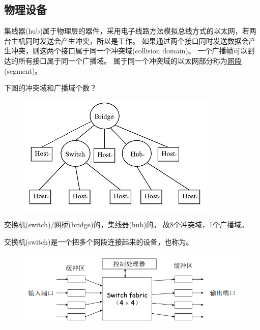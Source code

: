 \subsection{物理设备}
集线器(hub)属于物理层的器件，采用电子线路方法模拟总线方式的以太网，若两台主机同时发送会产生冲突，所以是工作。
如果通过两个接口同时发送数据会产生冲突，则这两个接口属于同一个冲突域(collision domain)。
一个广播帧可以到达的所有接口属于同一个广播域。
属于同一个冲突域的以太网部分称为\underline{网段}(segment)。
\begin{example}
	下图的冲突域和广播域个数？
	\begin{figure}[H]
		\centering
		\includegraphics[width=0.35\linewidth]{fig/conflict_count.jpg}
	\end{figure}
\end{example}
\begin{analysis}
交换机(switch)/网桥(bridge)的，集线器(hub)的。
故8个冲突域，1个广播域。
\end{analysis}

\myhline
交换机(switch)是一个把多个网段连接起来的设备，也称为。
\begin{figure}[H]
	\centering
	\includegraphics[width=0.6\linewidth]{fig/switch.png}
\end{figure}

